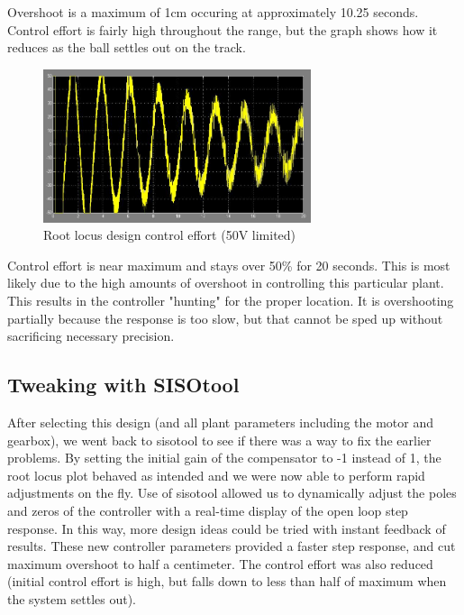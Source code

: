 Overshoot is a maximum of 1cm occuring at approximately 10.25 seconds. Control effort is fairly high throughout the range, but the graph shows how it reduces as the ball settles out on the track.

\begin{figure}[h]
	\centering
		\includegraphics[width=0.70\textwidth]{pics/controleffort}
	\caption{Root locus design control effort (50V limited)}
	\label{3:fig:controleffort}
\end{figure}
\FloatBarrier

Control effort is near maximum and stays over 50\% for 20 seconds. This is most likely due to the high amounts of overshoot in controlling this particular plant. This results in the controller "hunting" for the proper location. It is overshooting partially because the response is too slow, but that cannot be sped up without sacrificing necessary precision.

\pagebreak

\subsection{Tweaking with SISOtool}

After selecting this design (and all plant parameters including the motor and gearbox), we went back to sisotool to see if there was a way to fix the earlier problems. By setting the initial gain of the compensator to -1 instead of 1, the root locus plot behaved as intended and we were now able to perform rapid adjustments on the fly. Use of sisotool allowed us to dynamically adjust the poles and zeros of the controller with a real-time display of the open loop step response. In this way, more design ideas could be tried with instant feedback of results. These new controller parameters provided a faster step response, and cut maximum overshoot to half a centimeter. The control effort was also reduced (initial control effort is high, but falls down to less than half of maximum when the system settles out).

